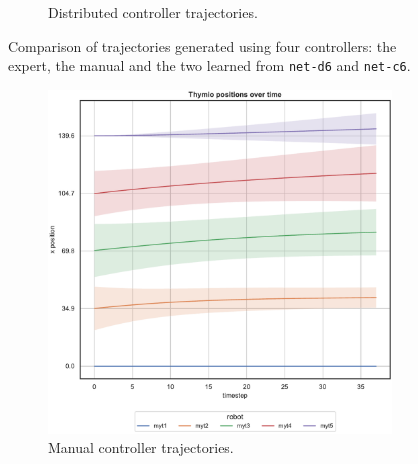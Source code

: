 \begin{figure}[!htb]
\begin{center}
\begin{subfigure}[h]{0.49\textwidth}
			\caption{Distributed controller trajectories.}
		\end{subfigure}
	\end{center}
	\vspace{-0.5cm}
	\caption[Evaluation of the trajectories learned by \texttt{net-c6}.]{Comparison 
		of trajectories generated using four controllers: the expert, the manual and 
		the two learned from \texttt{net-d6} and \texttt{net-c6}.}	
\end{figure}

\medskip
\begin{figure}[!htb]\ContinuedFloat
	\begin{center}
		\begin{subfigure}[h]{0.49\textwidth}
			\centering			
			\includegraphics[width=.9\textwidth]{contents/images/net-d6/position-overtime-manual}%
			\caption{Manual controller trajectories.}
		\end{subfigure}
		\hfill
		\begin{subfigure}[h]{0.49\textwidth}
			\centering

\end{subfigure}
\end{center}
\end{figure}
